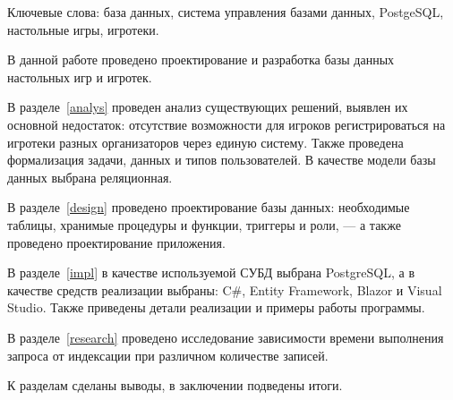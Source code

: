 \begin{essay}{}
    Ключевые слова: база данных, система управления базами данных, PostgeSQL,
    настольные игры, игротеки.

    В данной работе проведено проектирование и разработка базы данных настольных
    игр и игротек. 

    В разделе~\ref{analys} проведен анализ существующих решений, выявлен их
    основной недостаток: отсутствие возможности для игроков регистрироваться на
    игротеки разных организаторов через единую систему. Также проведена
    формализация задачи, данных и типов пользователей. В качестве модели базы
    данных выбрана реляционная.

    В разделе~\ref{design} проведено проектирование базы данных: необходимые
    таблицы, хранимые процедуры и функции, триггеры и роли, --- а также проведено
    проектирование приложения.

    В разделе~\ref{impl} в качестве используемой СУБД выбрана PostgreSQL, а в
    качестве средств реализации выбраны: C\#, Entity Framework, Blazor и Visual
    Studio. Также приведены детали реализации и примеры работы программы.

    В разделе~\ref{research} проведено исследование зависимости времени
    выполнения запроса от индексации при различном количестве записей.

    К разделам сделаны выводы, в заключении подведены итоги.
\end{essay}
